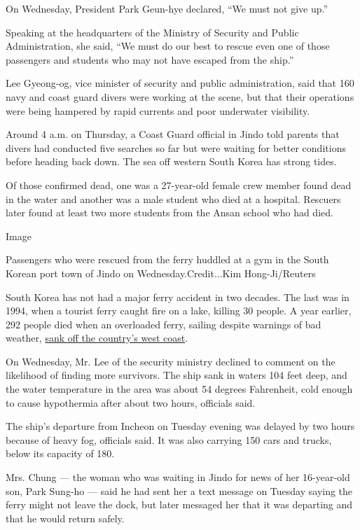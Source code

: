 On Wednesday, President Park Geun-hye declared, ``We must not give up.''

Speaking at the headquarters of the Ministry of Security and Public
Administration, she said, ``We must do our best to rescue even one of
those passengers and students who may not have escaped from the ship.''

Lee Gyeong-og, vice minister of security and public administration, said
that 160 navy and coast guard divers were working at the scene, but that
their operations were being hampered by rapid currents and poor
underwater visibility.

Around 4 a.m. on Thursday, a Coast Guard official in Jindo told parents
that divers had conducted five searches so far but were waiting for
better conditions before heading back down. The sea off western South
Korea has strong tides.

Of those confirmed dead, one was a 27-year-old female crew member found
dead in the water and another was a male student who died at a hospital.
Rescuers later found at least two more students from the Ansan school
who had died.

Image

Passengers who were rescued from the ferry huddled at a gym in the South
Korean port town of Jindo on Wednesday.Credit...Kim Hong-Ji/Reuters

South Korea has not had a major ferry accident in two decades. The last
was in 1994, when a tourist ferry caught fire on a lake, killing 30
people. A year earlier, 292 people died when an overloaded ferry,
sailing despite warnings of bad weather,
\href{http://www.nytimes3xbfgragh.onion/1993/10/11/world/100-feared-dead-off-south-korea.html}{sank
off the country's west coast}.

On Wednesday, Mr. Lee of the security ministry declined to comment on
the likelihood of finding more survivors. The ship sank in waters 104
feet deep, and the water temperature in the area was about 54 degrees
Fahrenheit, cold enough to cause hypothermia after about two hours,
officials said.

The ship's departure from Incheon on Tuesday evening was delayed by two
hours because of heavy fog, officials said. It was also carrying 150
cars and trucks, below its capacity of 180.

Mrs. Chung --- the woman who was waiting in Jindo for news of her
16-year-old son, Park Sung-ho --- said he had sent her a text message on
Tuesday saying the ferry might not leave the dock, but later messaged
her that it was departing and that he would return safely.

